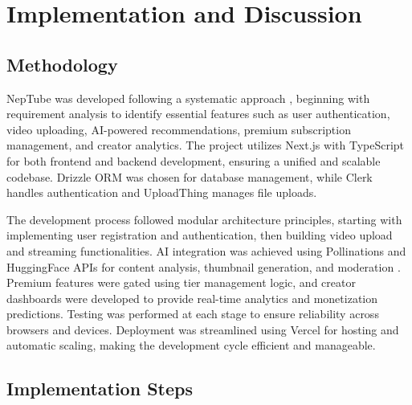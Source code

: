 \chapter{Implementation and Discussion}

\section{Methodology}

NepTube was developed following a systematic approach \cite{schwaber2020scrum}, beginning with requirement analysis to identify essential features such as user authentication, video uploading, AI-powered recommendations, premium subscription management, and creator analytics. The project utilizes Next.js \cite{vercel2024nextjs} with TypeScript \cite{typescript2024docs} for both frontend and backend development, ensuring a unified and scalable codebase. Drizzle ORM \cite{drizzle2024docs} was chosen for database management, while Clerk \cite{clerk2024docs} handles authentication and UploadThing \cite{uploadthing2024docs} manages file uploads.

The development process followed modular architecture principles, starting with implementing user registration and authentication, then building video upload and streaming functionalities. AI integration was achieved using Pollinations \cite{pollinations2024api} and HuggingFace APIs for content analysis, thumbnail generation, and moderation \cite{risch2020toxic}. Premium features were gated using tier management logic, and creator dashboards were developed to provide real-time analytics and monetization predictions. Testing was performed at each stage to ensure reliability across browsers and devices. Deployment was streamlined using Vercel for hosting and automatic scaling, making the development cycle efficient and manageable.

\section{Implementation Steps}

